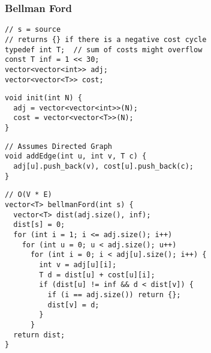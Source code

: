 \documentclass[twoside]{article}
\newcommand{\fileTitleStyle}{\large\underline}
\begin{document}
\begin{multicols*}{2}
\subsubsection*{Bellman Ford}
\begin{verbatim}
// s = source
// returns {} if there is a negative cost cycle
typedef int T;  // sum of costs might overflow
const T inf = 1 << 30;
vector<vector<int>> adj;
vector<vector<T>> cost;
\end{verbatim}
\vspace{-12pt}
\begin{verbatim}
void init(int N) {
  adj = vector<vector<int>>(N);
  cost = vector<vector<T>>(N);
}
\end{verbatim}
\vspace{-12pt}
\begin{verbatim}
// Assumes Directed Graph
void addEdge(int u, int v, T c) {
  adj[u].push_back(v), cost[u].push_back(c);
}
\end{verbatim}
\vspace{-12pt}
\begin{verbatim}
// O(V * E)
vector<T> bellmanFord(int s) {
  vector<T> dist(adj.size(), inf);
  dist[s] = 0;
  for (int i = 1; i <= adj.size(); i++)
    for (int u = 0; u < adj.size(); u++)
      for (int i = 0; i < adj[u].size(); i++) {
        int v = adj[u][i];
        T d = dist[u] + cost[u][i];
        if (dist[u] != inf && d < dist[v]) {
          if (i == adj.size()) return {};
          dist[v] = d;
        }
      }
  return dist;
}
\end{verbatim}

\subsubsectionfont{\centering\bfseries\Large}
\subsubsectionfont{\fileTitleStyle}

\end{multicols*}
\end{document}
